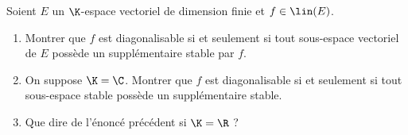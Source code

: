 \begin{enonce}
\begin{exercise}[ID={RMS135 E1421},subtitle={Navale MP 2024},tags={},difficulty={}]
Soient $E$ un $\K$-espace vectoriel de dimension finie et $f \in \lin(E)$.
\begin{enumerate}
  \item Montrer que $f$ est diagonalisable si et seulement si tout sous-espace vectoriel de $E$ possède un supplémentaire stable par $f$.
  \item On suppose $\K = \C$. Montrer que $f$ est diagonalisable si et seulement si tout sous-espace stable possède un supplémentaire stable.
  \item Que dire de l'énoncé précédent si $\K = \R$ ?
\end{enumerate}
\end{exercise}
\begin{solution}
\end{solution}
\end{enonce}
